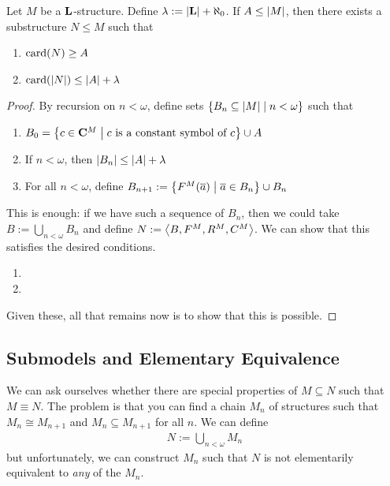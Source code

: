 \begin{boxtheorem}\label{Ch1:Thm:Submodel_Thm}
    Let $M$ be a $\mathbf{L}$-structure. Define $\lambda := \left\lvert \mathbf{L} \right\rvert + \aleph_{0}$. If $A \leq \left\lvert M \right\rvert$, then there exists a substructure $N \leq M$ such that
    \begin{enumerate}[label = (\alph*)]
        \item $\operatorname{card}\!\left( N \right) \geq A$
        \item $\operatorname{card}\!\left( \left\lvert N \right\rvert \right) \leq \left\lvert A \right\rvert + \lambda$
    \end{enumerate}
\end{boxtheorem}
\begin{proof}
    By recursion on $n < \omega$, define sets $\left\{ B_{n} \subseteq \left\lvert M \right\rvert \; \middle\vert \; n < \omega \right\}$ such that
    \begin{enumerate}
        \item $B_{0} = \left\{ c \in \mathbf{C}^M \; \middle\vert \; c \text{ is a constant symbol of } c \right\} \cup A$
        \item If $n < \omega$, then $\left\lvert B_n \right\rvert \leq \left\lvert A \right\rvert + \lambda$
        \item For all $n < \omega$, define $B_{n+1} := \left\{ F^M\!\left( \overline{a} \right) \; \middle\vert \; \overline{a} \in B_{n} \right\} \cup B_n$
    \end{enumerate}
    This is enough: if we have such a sequence of $B_n$, then we could take $B := \bigcup_{n < \omega} B_n$ and define $N := \left\langle B, F^M, R^M, C^M \right\rangle$. We can show that this satisfies the desired conditions.
    \begin{enumerate}[label = (\alph*)]
        \item \sorry
        \item \sorry
    \end{enumerate}

    Given these, all that remains now is to show that this is possible. \sorry{}
\end{proof}

\subsection{Submodels and Elementary Equivalence}

We can ask ourselves whether there are special properties of $M \subseteq N$ such that $M \equiv N$. The problem is that you can find a chain $M_n$ of structures such that $M_n \cong M_{n+1}$ and $M_n \subseteq M_{n + 1}$ for all $n$. We can define
\begin{align*}
    N := \bigcup_{n < \omega} M_n
\end{align*}
but unfortunately, we can construct $M_n$ such that $N$ is not elementarily equivalent to \textit{any} of the $M_n$.


